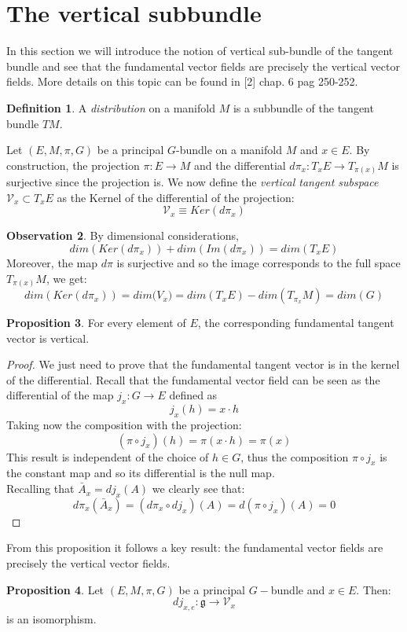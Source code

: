 \documentclass[12pt,a4paper]{report}
\theoremstyle{definition}
\newtheorem{Def}{Definition}[chapter]
\theoremstyle{Theorem}
\newtheorem{Prop}[Def]{Proposition}
\theoremstyle{definition}
\theoremstyle{definition}
\newtheorem{Obs}[Def]{Observation}
\begin{document}
	\section{The vertical subbundle}
	In this section we will introduce the notion of vertical sub-bundle of the tangent bundle and see that the fundamental vector fields are precisely the vertical vector fields. More details on this topic can be found in [2] chap. 6 pag 250-252.
	\begin{Def}
		A \textit{distribution} on a manifold $M$ is a subbundle of the tangent bundle $TM$.
	\end{Def}
	Let $(E,M,\pi,G)$ be a principal $G$-bundle on a manifold $M$ and $x\in E$. By construction, the projection $\pi:E\rightarrow M$ and the differential $d\pi_{x}:T_{x}E\rightarrow T_{\pi(x)}M$ is surjective since the projection is. We now define the \textit{vertical tangent subspace} $\mathcal{V}_{x}\subset T_{x}E$ as the Kernel of the differential of the projection:
	$$\mathcal{V}_{x}\equiv Ker(d\pi_{x})$$
	\begin{Obs}
		By dimensional considerations, 
		$$dim (Ker(d\pi_{x}))+dim(Im(d\pi_{x}))=dim(T_{x}E)$$
		Moreover, the map $d\pi$ is surjective and so the image corresponds to the full space $T_{\pi(x)}M$, we get:
		$$dim (Ker(d\pi_{x}))=dim\mathcal({V}_{x})=dim(T_{x}E)-dim(T_{\pi_{x}}M)=dim (G)$$
	\end{Obs}
	\begin{Prop}\label{fund_vec_are_vert}
		For every element of $E$, the corresponding fundamental tangent vector is vertical.
	\end{Prop}
	\begin{proof}
		We just need to prove that the fundamental tangent vector is in the kernel of the differential. Recall that the fundamental vector field can be seen as the differential of the map $j_{x}:G\rightarrow E$ defined as 
		$$j_{x}(h)=x\cdot h $$
		Taking now the composition with the projection:
		$$(\pi\circ j_{x})(h)=\pi(x\cdot h)=\pi(x)$$
		This result is independent of the choice of $h\in G$, thus the composition $\pi\circ j_{x}$ is the constant map and so its differential is the null map.\\
		Recalling that $\bar{A}_{x}=dj_{x}(A)$ we clearly see that:
		$$d\pi_{x}(\bar{A}_{x})=
		(d\pi_{x}\circ dj_{x})(A)=
		d(\pi\circ j_{x})(A)=0$$
	\end{proof}
	From this proposition it follows a key result: the fundamental vector fields are precisely the vertical vector fields.
	\begin{Prop}
		Let $(E,M,\pi,G)$ be a principal $G-$bundle and $x\in E$. Then: 
		$$dj_{x,e}:\mathfrak{g}\rightarrow \mathcal{V}_{x}$$ is an isomorphism.
	\end{Prop}
\end{document}
